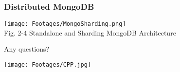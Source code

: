 \documentclass{beamer}
\begin{document}
\begin{frame} \small
\frametitle{Distributed MongoDB}
\begin{center}
\texttt{[image: Footages/MongoSharding.png]}\\
\scriptsize Fig. 2-4 Standalone and Sharding MongoDB Architecture
\end{center}
\end{frame}
\begin{frame}
\begin{center}
\LARGE Any questions?
\end{center}
\end{frame}

\begin{frame}
\begin{center}
  \texttt{[image: Footages/CPP.jpg]}
\end{center}
\end{frame}
\end{document}
